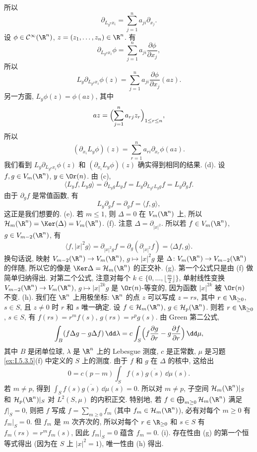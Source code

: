 \begin{solution}
\[\]
所以
\[
\partial_{L_{y^T}x_i} = \sum_{j=1}^n a_{ji}\partial_{x_j}.
\]
设 $\phi \in \mathcal{C}^{\infty}(\R^n)$, $z = (z_1, \ldots, z_n) \in \R^n$. 有
\[
\partial_{L_{y^T}x_i}\phi = \sum_{j=1}^n a_{ji}\frac{\partial\phi}{\partial x_j},
\]
所以
\[
L_y\partial_{L_{y^T}x_i}\phi(z) = \sum_{j=1}^n a_{ji}\frac{\partial\phi}{\partial x_j}(az).
\]
另一方面, $L_y\phi(z) = \phi(az)$, 其中
\[
az = \Bigl(\sum_{j=1}^n a_{rj}z_r\Bigr)_{1 \leq r \leq n},
\]
所以
\[
(\partial_{x_i}L_y\phi)(z) = \sum_{r=1}^n a_{ri}\partial_{x_r}\phi(az).
\]
我们看到 $L_y\partial_{L_{y^T}x_i}\phi(z)$ 和 $(\partial_{x_i}L_y\phi)(z)$ 确实得到相同的结果.
(d). 设 $f, g \in V_m(\R^n)$, $y \in \Or(n)$. 由 (c),
\[
\langle L_yf, L_yg \rangle = \partial_{L_yg}L_yf = L_y\partial_{L_{y^T}L_yg}f = L_y\partial_g f.
\]
由于 $\partial_g f$ 是常值函数, 有
\[
L_y\partial_g f = \partial_g f = \langle f, g \rangle,
\]
这正是我们想要的.
(e). 若 $m \leq 1$, 则 $\Delta = 0$ 在 $V_m(\R^n)$ 上, 所以 $\mathcal{H}_m(\R^n) = \Ker(\Delta) = V_m(\R^n)$.
(f). 注意 $\Delta = \partial_{|x|^2}$. 所以若 $f \in V_m(\R^n)$, $g \in V_{m-2}(\R^n)$, 有
\[
\langle f, |x|^2g \rangle = \partial_{|x|^2g}f = \partial_g(\partial_{|x|^2}f) = \langle \Delta f, g \rangle.
\]
换句话说, 映射 $V_{m-2}(\R^n) \to V_m(\R^n)$, $g \longmapsto |x|^2g$ 是 $\Delta \colon V_m(\R^n) \to V_{m-2}(\R^n)$ 的伴随, 所以它的像是 $\Ker\Delta = \mathcal{H}_m(\R^n)$ 的正交补.
(g). 第一个公式只是由 (f) 做简单归纳得出. 对第二个公式, 注意对每个 $k \in \{0, \ldots, \lfloor\frac{m}{2}\rfloor\}$, 单射线性变换 $V_{m-2}(\R^n) \to V_m(\R^n)$, $g \longmapsto |x|^{2k}g$ 是 $\Or(n)$-等变的, 因为函数 $|x|^{2k}$ 被 $\Or(n)$ 不变.
(h). 我们在 $\R^n$ 上用极坐标: $\R^n$ 的点 $z$ 可以写成 $z = rs$, 其中 $r \in \R_{\geq 0}$, $s \in S$, 且 $z \neq 0$ 时 $r$ 和 $s$ 唯一确定.
设 $f \in \mathcal{H}_m(\R^n)$, $g \in \mathcal{H}_p(\R^n)$. 则若 $r \in \R_{\geq 0}$, $s \in S$, 有 $f(rs) = r^mf(s)$, $g(rs) = r^pg(s)$. 由 Green 第二公式,
\[
\int_B (f\Delta g - g\Delta f)\,\dd\lambda = c\int_S\Bigl(f\frac{\partial g}{\partial r} - g\frac{\partial f}{\partial r}\Bigr)\,\dd\mu,
\]
其中 $B$ 是闭单位球, $\lambda$ 是 $\R^n$ 上的 Lebesgue 测度, $c$ 是正常数, $\mu$ 是习题 \ref{ex:I.5.3.5}(f) 中定义的 $S$ 上的测度. 由于 $f$ 和 $g$ 在 $\Delta$ 的核中, 这给出
\[
0 = c(p - m)\int_S f(s)\overline{g(s)}\,\dd\mu(s).
\]
若 $m \neq p$, 得到 $\int_S f(s)\overline{g(s)}\,\dd\mu(s) = 0$. 所以对 $m \neq p$, 子空间 $\mathcal{H}_m(\R^n)|_S$ 和 $\mathcal{H}_p(\R^n)|_S$ 对 $L^2(S, \mu)$ 的内积正交. 特别地, 若 $f \in \bigoplus_{m \geq 0}\mathcal{H}_m(\R^n)$ 满足 $f|_S = 0$, 则把 $f$ 写成 $f = \sum_{m \geq 0}f_m$ (其中 $f_m \in \mathcal{H}_m(\R^n)$), 必有对每个 $m \geq 0$ 有 $f_m|_S = 0$. 但 $f_m$ 是 $m$ 次齐次的, 所以对每个 $r \in \R_{\geq 0}$ 和 $s \in S$ 有 $f_m(rs) = r^mf_m(s)$, 因此 $f_m|_S = 0$ 蕴含 $f_m = 0$.
(i). 存在性由 (g) 的第一个恒等式得出 (因为在 $S$ 上 $|x|^2 = 1$), 唯一性由 (h) 得出.
\end{solution}

